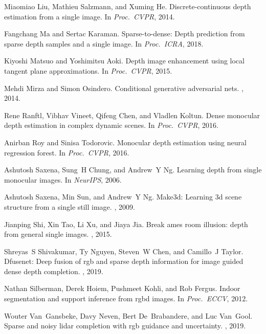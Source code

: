 \documentclass[10pt,twocolumn,letterpaper]{article}
\begin{document}
{\begin{thebibliography}{10}
Miaomiao Liu, Mathieu Salzmann, and Xuming He.
\newblock Discrete-continuous depth estimation from a single image.
\newblock In {\em Proc.~CVPR}, 2014.

Fangchang Ma and Sertac Karaman.
\newblock Sparse-to-dense: Depth prediction from sparse depth samples and a
  single image.
\newblock In {\em Proc.~ICRA}, 2018.

Kiyoshi Matsuo and Yoshimitsu Aoki.
\newblock Depth image enhancement using local tangent plane approximations.
\newblock In {\em Proc.~CVPR}, 2015.

Mehdi Mirza and Simon Osindero.
\newblock Conditional generative adversarial nets.
, 2014.

Rene Ranftl, Vibhav Vineet, Qifeng Chen, and Vladlen Koltun.
\newblock Dense monocular depth estimation in complex dynamic scenes.
\newblock In {\em Proc.~CVPR}, 2016.

Anirban Roy and Sinisa Todorovic.
\newblock Monocular depth estimation using neural regression forest.
\newblock In {\em Proc.~CVPR}, 2016.

Ashutosh Saxena, Sung~H Chung, and Andrew~Y Ng.
\newblock Learning depth from single monocular images.
\newblock In {\em NeurIPS}, 2006.

Ashutosh Saxena, Min Sun, and Andrew~Y Ng.
\newblock Make3d: Learning 3d scene structure from a single still image.
, 2009.

Jianping Shi, Xin Tao, Li Xu, and Jiaya Jia.
\newblock Break ames room illusion: depth from general single images.
, 2015.

Shreyas~S Shivakumar, Ty Nguyen, Steven~W Chen, and Camillo~J Taylor.
\newblock Dfusenet: Deep fusion of rgb and sparse depth information for image
  guided dense depth completion.
, 2019.

Nathan Silberman, Derek Hoiem, Pushmeet Kohli, and Rob Fergus.
\newblock Indoor segmentation and support inference from rgbd images.
\newblock In {\em Proc.~ECCV}, 2012.

Wouter Van~Gansbeke, Davy Neven, Bert De~Brabandere, and Luc Van~Gool.
\newblock Sparse and noisy lidar completion with rgb guidance and uncertainty.
, 2019.


\end{thebibliography}}
\end{document}
